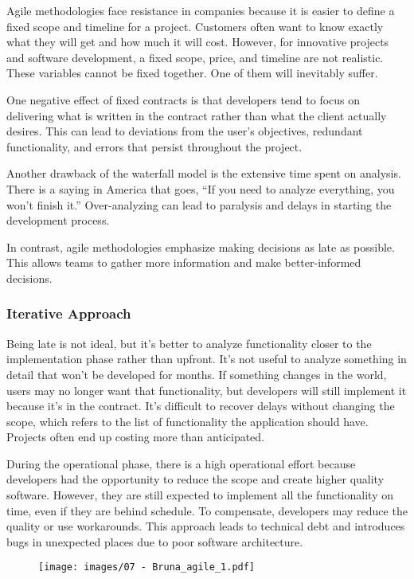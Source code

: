 Agile methodologies face resistance in companies because it is easier to
define a fixed scope and timeline for a project. Customers often want to
know exactly what they will get and how much it will cost. However, for
innovative projects and software development, a fixed scope, price, and
timeline are not realistic. These variables cannot be fixed together.
One of them will inevitably suffer.

One negative effect of fixed contracts is that developers tend to focus
on delivering what is written in the contract rather than what the
client actually desires. This can lead to deviations from the user's
objectives, redundant functionality, and errors that persist throughout
the project.

Another drawback of the waterfall model is the extensive time spent on
analysis. There is a saying in America that goes, ``If you need to
analyze everything, you won't finish it.'' Over-analyzing can lead to
paralysis and delays in starting the development process.

In contrast, agile methodologies emphasize making decisions as late as
possible. This allows teams to gather more information and make
better-informed decisions.

\subsubsection{Iterative Approach}

Being late is not ideal, but it's better to analyze functionality closer
to the implementation phase rather than upfront. It's not useful to
analyze something in detail that won't be developed for months. If
something changes in the world, users may no longer want that
functionality, but developers will still implement it because it's in
the contract. It's difficult to recover delays without changing the
scope, which refers to the list of functionality the application should
have. Projects often end up costing more than anticipated.

During the operational phase, there is a high operational effort because
developers had the opportunity to reduce the scope and create higher
quality software. However, they are still expected to implement all the
functionality on time, even if they are behind schedule. To compensate,
developers may reduce the quality or use workarounds. This approach
leads to technical debt and introduces bugs in unexpected places due to
poor software architecture.

\begin{figure}[!h]
    \centering
    \texttt{[image: images/07 - Bruna\_agile\_1.pdf]}
\end{figure}

